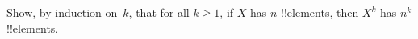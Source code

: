 	\begin{prob}
		Show, by induction on~$k$, that for all $k \ge 1$, if $X$ has $n$
		!!{element}s, then $X^k$ has $n^k$ !!{element}s.
	\end{prob}
	

